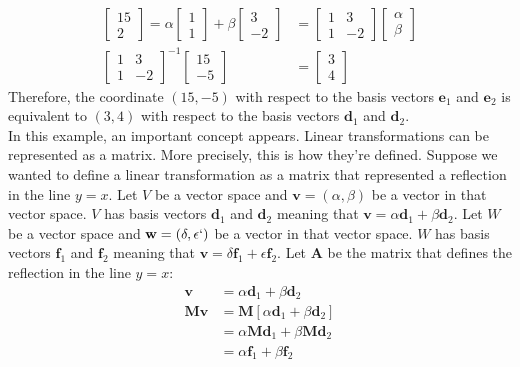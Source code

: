 \documentclass[a4paper,12pt]{book}
\newcommand{\matrx}[1]{\bm{#1}}
\newcommand{\vectr}[1]{\textbf{#1}}
\begin{document}
	\begin{align}
		\begin{bmatrix}
			15 \\ 2
		\end{bmatrix} = \alpha \begin{bmatrix}
			1 \\ 1 
		\end{bmatrix} + \beta \begin{bmatrix}
		    3 \\ -2
		\end{bmatrix} &= \begin{bmatrix}
			1 & 3 \\ 
			1 & -2 
		\end{bmatrix} \begin{bmatrix}
			\alpha \\ \beta
		\end{bmatrix} \\
		\begin{bmatrix}
			1 & 3 \\
			1 & -2 
		\end{bmatrix}^{-1} 
		\begin{bmatrix}
			15 \\ -5
		\end{bmatrix}
		&= \begin{bmatrix}
			3 \\ 4
		\end{bmatrix}
	\end{align}
	Therefore, the coordinate $ (15, -5) $ with respect to the basis vectors $ \vectr{e}_1 $ and $ \vectr{e}_2 $ is equivalent to $ (3, 4) $ with respect to the basis vectors $ \vectr{d}_1 $ and $ \vectr{d}_2 $. \\	
	In this example, an important concept appears. Linear transformations can be represented as a matrix. More precisely, this is how they're defined. Suppose we wanted to define a linear transformation as a matrix that represented a reflection in the line $ y = x $. Let $ V $ be a vector space and $ \vectr{v} = (\alpha, \beta) $ be a vector in that vector space. $ V $ has basis vectors $ \vectr{d}_1 $ and $ \vectr{d}_2 $ meaning that $ \vectr{v} = \alpha \vectr{d}_1 + \beta \vectr{d}_2 $. Let $ W $ be a vector space and $ \vectr{w} = (\delta, \epsilon`) $ be a vector in that vector space. $ W $ has basis vectors $ \vectr{f}_1 $ and $ \vectr{f}_2 $ meaning that $ \vectr{v} = \delta \vectr{f}_1 + \epsilon \vectr{f}_2 $. Let $ \matrx{A} $ be the matrix that defines the reflection in the line $ y = x $:
	\begin{align}
		\vectr{v} &= \alpha \vectr{d}_1 + \beta \vectr{d}_2 \\
		\matrx{M} \vectr{v} &= \matrx{M} [ \alpha \vectr{d}_1 + \beta \vectr{d}_2] \\
		 &= \alpha \matrx{M} \vectr{d}_1 + \beta \matrx{M} \vectr{d}_2 \\
		 &= \alpha \vectr{f}_1 + \beta \vectr{f}_2
	\end{align}
\end{document}

